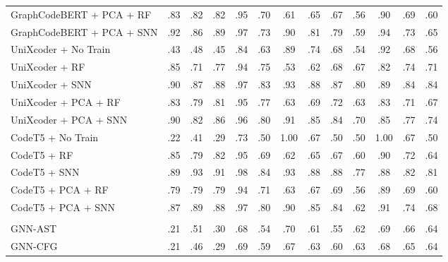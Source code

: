 \begin{table}[!htbp]
\begin{adjustbox}{
    max width=\columnwidth,
    max totalheight=1.0\textheight,
    keepaspectratio,
    center
}
\begin{tabular}{@{}l*{12}{c}@{}}
GraphCodeBERT + PCA + RF
& .83 & .82 & .82 & .95
& .70 & .61 & .65 & .67
& .56 & .90 & .69 & .60 \\

GraphCodeBERT + PCA + SNN
& .92 & .86 & .89 & .97
& .73 & .90 & .81 & .79
& .59 & .94 & .73 & .65 \\

UniXcoder + No Train
& .43 & .48 & .45 & .84
& .63 & .89 & .74 & .68
& .54 & .92 & .68 & .56 \\

UniXcoder + RF
& .85 & .71 & .77 & .94
& .75 & .53 & .62 & .68
& .67 & .82 & .74 & .71 \\

\rowcolor{green!15}
UniXcoder + SNN
& .90 & .87 & .88 & .97
& .83 & .93 & .88 & .87
& .80 & .89 & .84 & .84 \\

UniXcoder + PCA + RF
& .83 & .79 & .81 & .95
& .77 & .63 & .69 & .72
& .63 & .83 & .71 & .67 \\

UniXcoder + PCA + SNN
& .90 & .82 & .86 & .96
& .80 & .91 & .85 & .84
& .70 & .85 & .77 & .74 \\

CodeT5 + No Train
& .22 & .41 & .29 & .73
& .50 & 1.00 & .67 & .50
& .50 & 1.00 & .67 & .50 \\

CodeT5 + RF
& .85 & .79 & .82 & .95
& .69 & .62 & .65 & .67
& .60 & .90 & .72 & .64 \\

CodeT5 + SNN
& .89 & .93 & .91 & .98
& .84 & .93 & .88 & .88
& .77 & .88 & .82 & .81 \\

CodeT5 + PCA + RF
& .79 & .79 & .79 & .94
& .71 & .63 & .67 & .69
& .56 & .89 & .69 & .60 \\

CodeT5 + PCA + SNN
& .87 & .89 & .88 & .97
& .80 & .90 & .85 & .84
& .62 & .91 & .74 & .68 \\

\rowcolor{black!7}
\multicolumn{13}{@{}l}{\textit{GNN baselines}}\\[0pt]

GNN-AST
& .21 & .51 & .30 & .68
& .54 & .70 & .61 & .55
& .62 & .69 & .66 & .64 \\

GNN-CFG
& .21 & .46 & .29 & .69
& .59 & .67 & .63 & .60
& .63 & .68 & .65 & .64 \\


\end{tabular}
\end{adjustbox}
\end{table}
